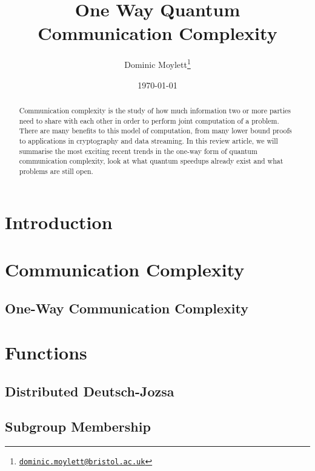 \documentclass[a4paper]{article}
\begin{document}
    \title{One Way Quantum Communication Complexity}
    \author{Dominic Moylett\thanks{\texttt{\href{dominic.moylett@bristol.ac.uk}{dominic.moylett@bristol.ac.uk}}}}
    \date{\today}
    \maketitle

    \begin{abstract}
        Communication complexity is the study of how much information two or more parties need to share with each other in order to perform joint computation of a problem. There are many benefits to this model of computation, from many lower bound proofs to applications in cryptography and data streaming. In this review article, we will summarise the most exciting recent trends in the one-way form of quantum communication complexity, look at what quantum speedups already exist and what problems are still open.
    \end{abstract}
    
    \section{Introduction}
    
    \section{Communication Complexity}
    
        \subsection{One-Way Communication Complexity}

    \section{Functions}
    
        \subsection{Distributed Deutsch-Jozsa}
        
        \subsection{Subgroup Membership}
        
\end{document}
